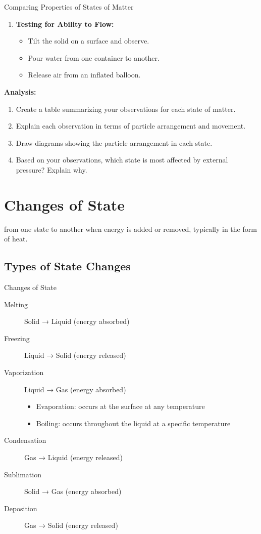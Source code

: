 \begin{investigation}{Comparing Properties of States of Matter}
\begin{enumerate}
    \item \textbf{Testing for Ability to Flow:}
    \begin{itemize}
        \item Tilt the solid on a surface and observe.
        \item Pour water from one container to another.
        \item Release air from an inflated balloon.
    \end{itemize}
\end{enumerate}

\textbf{Analysis:}
\begin{enumerate}
    \item Create a table summarizing your observations for each state of matter.
    \item Explain each observation in terms of particle arrangement and movement.
    \item Draw diagrams showing the particle arrangement in each state.
    \item Based on your observations, which state is most affected by external pressure? Explain why.
\end{enumerate}
\end{investigation}

\section{Changes of State}

 from one state to another when energy is added or removed, typically in the form of heat.

\subsection{Types of State Changes}

\begin{keyconcept}{Changes of State}
\begin{description}
    \item[Melting] Solid → Liquid (energy absorbed)
    \item[Freezing] Liquid → Solid (energy released)
    \item[Vaporization] Liquid → Gas (energy absorbed)
    \begin{itemize}
        \item Evaporation: occurs at the surface at any temperature
        \item Boiling: occurs throughout the liquid at a specific temperature
    \end{itemize}
    \item[Condensation] Gas → Liquid (energy released)
    \item[Sublimation] Solid → Gas (energy absorbed)
    \item[Deposition] Gas → Solid (energy released)
\end{description}
\end{keyconcept}

